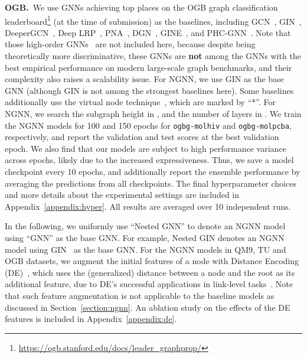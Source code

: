\documentclass{article}
\begin{document}
\textbf{OGB.}~We use GNNs achieving top places on the OGB graph classification leaderboard\footnote{\url{https://ogb.stanford.edu/docs/leader_graphprop/}} (at the time of submission) as the baselines, including GCN~\citep{kipf2016semi}, GIN~\citep{xu2018powerful}, DeeperGCN~\citep{li2020deepergcn}, Deep LRP~\citep{chen2020can}, PNA~\citep{corso2020principal}, DGN~\citep{beaini2020directional}, GINE~\citep{brossard2020graph}, and PHC-GNN~\citep{le2021parameterized}. Note that those high-order GNNs~\citep{morris2019weisfeiler,maron2019provably,chen2019equivalence,morris2020weisfeiler} are not included here, because despite being theoretically more discriminative, these GNNs are \textbf{not} among the GNNs with the best empirical performance on modern large-scale graph benchmarks, and their  complexity also raises a scalability issue.
For NGNN, we use GIN as the base GNN (although GIN is not among the strongest baselines here). Some baselines additionally use the virtual node technique~\citep{gilmer2017neural,li2015gated,ishiguro2019graph}, which are marked by ``*''. For NGNN, we search the subgraph height  in , and the number of layers in . We train the NGNN models for 100 and 150 epochs for \texttt{ogbg-molhiv} and \texttt{ogbg-molpcba}, respectively, and report the validation and test scores at the best validation epoch. We also find that our models are subject to high performance variance across epochs, likely due to the increased expressiveness. Thus, we save a model checkpoint every 10 epochs, and additionally report the ensemble performance by averaging the predictions from all checkpoints. The final hyperparameter choices and more details about the experimental settings are included in Appendix~\ref{appendix:hyper}.
All results are averaged over 10 independent runs. 

In the following, we uniformly use ``Nested GNN'' to denote an NGNN model using ``GNN'' as the base GNN. For example, Nested GIN denotes an NGNN model using GIN~\citep{xu2018powerful} as the base GNN.
For the NGNN models in QM9, TU and OGB datasets, we augment the initial features of a node with Distance Encoding (DE)~\citep{li2020distance}, which uses the (generalized) distance between a node and the root as its additional feature, due to DE's successful applications in link-level tasks~\citep{zhang2018link,Zhang2020Inductive}. Note that such feature augmentation is not applicable to the baseline models as discussed in Section~\ref{section:ngnn}. An ablation study on the effects of the DE features is included in Appendix~\ref{appendix:de}. 
\end{document}
